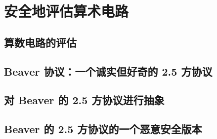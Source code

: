 \section{安全地评估算术电路}\label{sec:22-2}

\subsection{算数电路的评估}\label{subsec:22-2-1}

\subsection{Beaver 协议：一个诚实但好奇的 2.5 方协议}\label{subsec:22-2-2}

\subsection{对 Beaver 的 2.5 方协议进行抽象}\label{subsec:22-2-3}

\subsection{Beaver 的 2.5 方协议的一个恶意安全版本}\label{subsec:22-2-4}